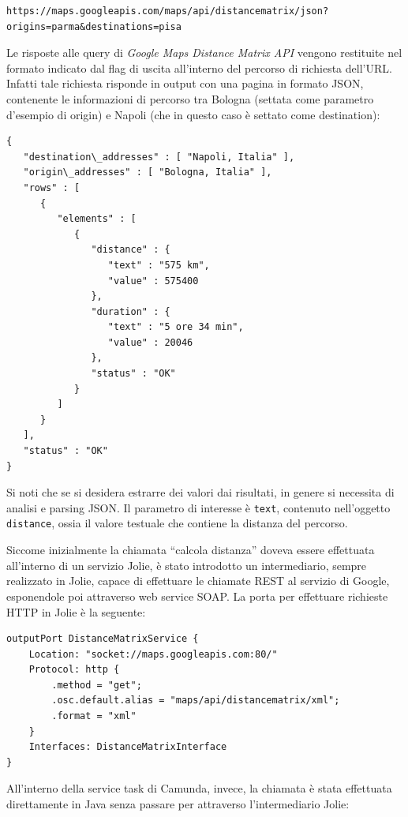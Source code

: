 \documentclass[twoside]{article}
\begin{document}
\begin{lstlisting}
https://maps.googleapis.com/maps/api/distancematrix/json?origins=parma&destinations=pisa
\end{lstlisting}

Le risposte alle query di \emph{Google Maps Distance Matrix API} vengono restituite
nel formato indicato dal flag di uscita all'interno del percorso di richiesta dell'URL.
Infatti tale richiesta risponde in output con una pagina in formato JSON, contenente le informazioni di
percorso tra Bologna (settata come parametro d'esempio di origin) e Napoli
(che in questo caso è settato come destination):

\begin{lstlisting}
{
   "destination\_addresses" : [ "Napoli, Italia" ],
   "origin\_addresses" : [ "Bologna, Italia" ],
   "rows" : [
      {
         "elements" : [
            {
               "distance" : {
                  "text" : "575 km",
                  "value" : 575400
               },
               "duration" : {
                  "text" : "5 ore 34 min",
                  "value" : 20046
               },
               "status" : "OK"
            }
         ]
      }
   ],
   "status" : "OK"
}
\end{lstlisting}

Si noti che se si desidera estrarre dei valori dai risultati, in genere si necessita di analisi
e parsing JSON. Il parametro di interesse è \texttt{text}, contenuto nell'oggetto \texttt{distance},
ossia il valore testuale che contiene la distanza del percorso.

Siccome inizialmente la chiamata ``calcola distanza'' doveva essere effettuata all'interno di un
servizio Jolie, è stato introdotto un intermediario, sempre realizzato in Jolie, capace di effettuare le
chiamate REST al servizio di Google, esponendole poi attraverso web service SOAP.
La porta per effettuare richieste HTTP in Jolie è la seguente:

\begin{lstlisting}
outputPort DistanceMatrixService {
	Location: "socket://maps.googleapis.com:80/"
	Protocol: http { 
		.method = "get";
		.osc.default.alias = "maps/api/distancematrix/xml";
		.format = "xml"
	}
	Interfaces: DistanceMatrixInterface
}
\end{lstlisting}

All'interno della service task di Camunda, invece, la chiamata è stata effettuata direttamente
in Java senza passare per attraverso l'intermediario Jolie:
\end{document}
